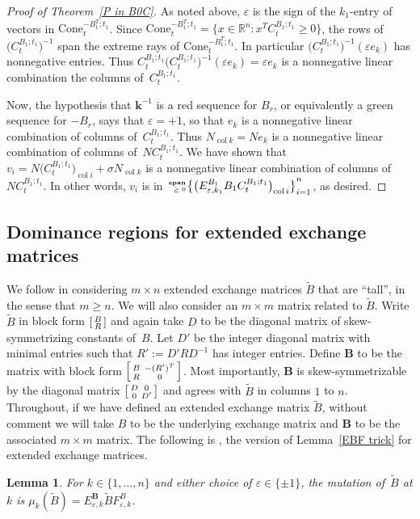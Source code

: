 \documentclass{amsart}
\newtheorem{lemma}[proposition]{Lemma}
\theoremstyle{definition}
\theoremstyle{remark}
\numberwithin{equation}{section}
\newcommand{\reals}{\mathbb R}
\newcommand{\ep}{\varepsilon}
\newcommand{\col}{\operatorname{col}}
\newcommand{\nnspan}{{\!\!\tiny\begin{array}{r}\mathbf{span}\\\ge0\end{array}\hspace*{-0.57em}}}
\newcommand{\set}[1]{{\lbrace #1 \rbrace}}
\newcommand{\sett}[1]{{\bigl\lbrace #1 \bigr\rbrace}}
\newcommand{\0}{{\mathbf{0}}}
\newcommand{\Cone}{\mathrm{Cone}}
\newcommand{\kk}{{\boldsymbol{k}}}
\newcommand{\tB}{{\widetilde{B}}}
\newcommand{\BB}{\mathbf{B}}
\newcommand{\R}{\mathcal{R}}
\newcommand{\symmetrizer}{{D}}
\begin{document}
\begin{proof}[Proof of Theorem~\ref{P in B0C}]
As noted above, $\ep$ is the sign of the $k_1$-entry of vectors in $\Cone_t^{-B_1^T;t_1}$.
Since $\Cone^{-B_1^T;t_1}_t=\set{x\in\reals^n:x^TC_t^{B_1;t_1}\ge0}$, the rows of $\bigl(C_t^{B_1;t_1}\bigr)^{-1}$ span the extreme rays of $\Cone_t^{-B_1^T;t_1}$.
In particular $\bigl(C_t^{B_1;t_1}\bigr)^{-1}(\ep e_k)$ has nonnegative entries.
Thus $C_t^{B_1;t_1}\bigl(C_t^{B_1;t_1}\bigr)^{-1}(\ep e_k)=\ep e_k$ is a nonnegative linear combination the columns of~$C_t^{B_1;t_1}$.

Now, the hypothesis that $\kk^{-1}$ is a red sequence for $B_r$, or equivalently a green sequence for $-B_r$, says that $\ep=+1$, so that $e_k$ is a nonnegative linear combination of columns of~$C_t^{B_1;t_1}$.
Thus $N_{\col k}=Ne_k$ is a nonnegative linear combination of columns of~$NC_t^{B_1;t_1}$.
We have shown that $v_i=N\bigl(C_t^{B_1;t_1}\bigr)_{\col i}+\sigma N_{\col k}$ is a nonnegative linear combination of columns of~$NC_t^{B_1;t_1}$.
In other words, $v_i$ is in $\nnspan\sett{\bigl(E^{B_1}_{\ep,k_1}B_1C_t^{B_1;t_1}\bigr)_{\col i}}_{i=1}^n$, as desired.
\end{proof}

\subsection{Dominance regions for extended exchange matrices}\label{ext sec}
We follow \cite{ca4} in considering $m\times n$ extended exchange matrices $\tB$ that are ``tall'', in the sense that $m\ge n$.
We will also consider an $m\times m$ matrix related to $\tB$.
Write $\tB$ in block form $\begin{bsmallmatrix}B\\R\end{bsmallmatrix}$ and again take $\symmetrizer$ to be the diagonal matrix of skew-symmetrizing constants of~$B$.
Let $\symmetrizer'$ be the integer diagonal matrix with minimal entries such that $R':=\symmetrizer'R\symmetrizer^{-1}$ has integer entries.
Define $\BB$ to be the matrix with block form $\begin{bsmallmatrix}B\,&-(R')^T\\R\,&0\end{bsmallmatrix}$.
Most importantly, $\BB$ is skew-symmetrizable by the diagonal matrix $\begin{bsmallmatrix}\symmetrizer&0\\0&\symmetrizer'\end{bsmallmatrix}$ and agrees with $\tB$ in columns $1$ to $n$.
  Throughout, if we have defined an extended exchange matrix $\tB$, without comment we will take $B$ to be the underlying exchange matrix and $\BB$ to be the associated $m\times m$ matrix.
The following is \cite[(3.2)]{ca3}, the version of Lemma~\ref{EBF trick} for extended exchange matrices.
\begin{lemma}\label{EBF trick ext}
For $k\in\set{1,\ldots,n}$ and either choice of $\ep\in\set{\pm1}$, the mutation of~$\tB$ at $k$ is $\mu_k(\tB)=E_{\ep,k}^\BB \tB F_{\ep,k}^B$.
\end{lemma}
\end{document}
